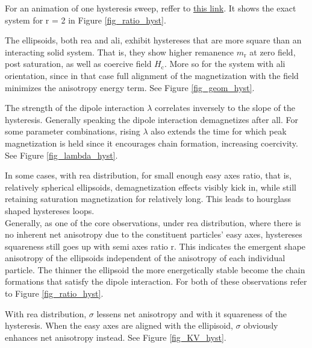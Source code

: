 \documentclass[12pt, DIV=12]{scrartcl}
\begin{document}
For an animation of one hysteresis sweep, reffer to \href{https://www.dropbox.com/scl/fi/klkqul893hg7puq5soq2m/Hysteresis.mp4?rlkey=0k68552s0b20lvw52iaiftr1p&st=2bwjdtpg&dl=0}{this link}. It shows the exact system for r = 2 in Figure \ref{fig_ratio_hyst}.

The ellipsoids, both rea and ali, exhibit hystereses that are more square than an interacting solid system. That is, they show higher remanence $m_\mathrm{r}$ at zero field, post saturation, as well as coercive field $H_\mathrm{c}$. More so for the system with ali orientation, since in that case full alignment of the magnetization with the field minimizes the anisotropy energy term. See Figure \ref{fig_geom_hyst}.

The strength of the dipole interaction $\lambda$ correlates inversely to the slope of the hysteresis. Generally speaking the dipole interaction demagnetizes after all. For some parameter combinations, rising $\lambda$ also extends the time for which peak magnetization is held since it encourages chain formation, increasing coercivity. See Figure \ref{fig_lambda_hyst}.

In some cases, with rea distribution, for small enough easy axes ratio, that is, relatively spherical ellipsoids, demagnetization effects visibly kick in, while still retaining saturation magnetization for relatively long. This leads to hourglass shaped hystereses loops.\\
Generally, as one of the core observations, under rea distribution, where there is no inherent net anisotropy due to the constituent particles' easy axes, hystereses squareness still goes up with semi axes ratio r. This indicates the emergent shape anisotropy of the ellipsoids independent of the anisotropy of each individual particle. The thinner the ellipsoid the more energetically stable become the chain formations that satisfy the dipole interaction. For both of these observations refer to Figure \ref{fig_ratio_hyst}.

With rea distribution, $\sigma$ lessens net anisotropy and with it squareness of the hysteresis. When the easy axes are aligned with the ellipisoid, $\sigma$ obviously enhances net anisotropy instead. See Figure \ref{fig_KV_hyst}.
\end{document}
